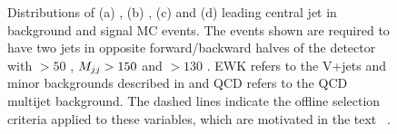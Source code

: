 \begin{figure}
  \caption{Distributions of (a) \Mjj, (b) \detajj, (c) \dphijj and (d) leading central jet \pt in background and signal \ac{MC} events. The events shown are required to have two jets in opposite forward/backward halves of the detector with \pt$>50$ \GeV, $M_{jj}>150$ \GeV and \METnoMU$>130$ \GeV. EWK refers to the V+jets and minor backgrounds described in  and \ac{QCD} refers to the \ac{QCD} multijet background. The dashed lines indicate the offline selection criteria applied to these variables, which are motivated in the text ~\cite{Chatrchyan:2014tja}.}
  \label{fig:promptcontrolplots}
\end{figure}


